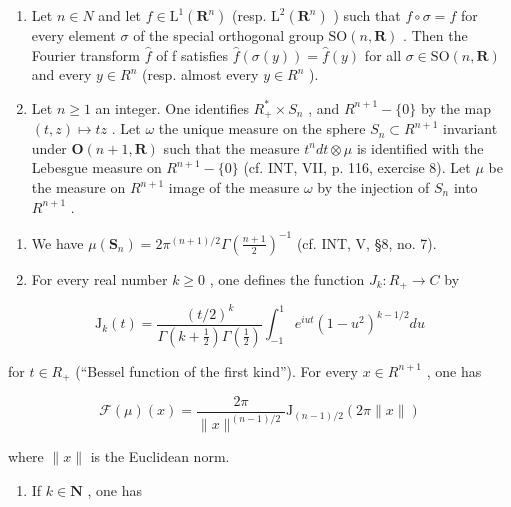 \begin{enumerate}
\def\labelenumi{\arabic{enumi})}
\setcounter{enumi}{18}
\item
  Let \(n \in N\) and let \(f \in \mathrm{L}^{1}(\mathbf{R}^{n})\) (resp. \(\mathrm{L}^{2}(\mathbf{R}^{n})\) ) such that \(f \circ \sigma = f\) for every element \(\sigma\) of the special orthogonal group \(\mathrm{SO}(n, \mathbf{R})\) . Then the Fourier transform \(\widehat{f}\) of f satisfies \(\widehat{f}(\sigma(y)) = \widehat{f}(y)\) for all \(\sigma \in \mathrm{SO}(n, \mathbf{R})\) and every \(y \in R^{n}\) (resp. almost every \(y \in R^{n}\) ).
\item
  Let \(n \geqslant 1\) an integer. One identifies \(R_{+}^{*} \times S_{n}\) , and \(R^{n+1} - \{0\}\) by the map \((t, z) \mapsto tz\) . Let \(\omega\) the unique measure on the sphere \(S_{n} \subset R^{n+1}\) invariant under \(\mathbf{O}(n + 1, \mathbf{R})\) such that the measure \(t^{n}dt \otimes \mu\) is identified with the Lebesgue measure on \(R^{n+1} - \{0\}\) (cf. INT, VII, p. 116, exercise 8). Let \(\mu\) be the measure on \(R^{n+1}\) image of the measure \(\omega\) by the injection of \(S_{n}\) into \(R^{n+1}\) .
\end{enumerate}

\begin{enumerate}
\def\labelenumi{\alph{enumi})}
\item
  We have \(\mu (\mathbf{S}_n) = 2\pi^{(n + 1) / 2}\Gamma (\frac{n + 1}{2})^{-1}\) (cf. INT, V, §8, no. 7).
\item
  For every real number \(k \geqslant 0\) , one defines the function \(J_{k} \colon R_{+} \to C\) by
\end{enumerate}

\[
\mathrm{J} _ {k} (t) = \frac {(t / 2) ^ {k}}{\Gamma (k + \frac {1}{2}) \Gamma (\frac {1}{2})} \int_ {- 1} ^ {1} e ^ {i u t} (1 - u ^ {2}) ^ {k - 1 / 2} d u
\]

for \(t \in R_{+}\) (“Bessel function of the first kind”). For every \(x \in R^{n+1}\) , one has

\[
\mathcal {F} (\mu) (x) = \frac {2 \pi}{\| x \| ^ {(n - 1) / 2}} \mathrm{J} _ {(n - 1) / 2} (2 \pi \| x \|)
\]

where \(\|x\|\) is the Euclidean norm.

\begin{enumerate}
\def\labelenumi{\alph{enumi})}
\setcounter{enumi}{2}
\tightlist
\item
  If \(k\in \mathbf{N}\) , one has
\end{enumerate}

